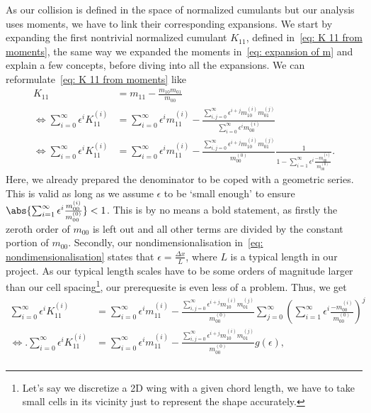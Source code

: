 As our collision is defined in the space of normalized cumulants but our analysis uses moments, we have to link their corresponding expansions.
We start by expanding the first nontrivial normalized cumulant $K_{11}$, defined in~\eqref{eq: K 11 from moments}, the same way we expanded the moments in~\eqref{eq: expansion of m} and explain a few concepts, before diving into all the expansions.
We can reformulate~\eqref{eq: K 11 from moments} like
\begin{equation}
  \label{eq: first expansion}
  \begin{aligned}
    K_{11} & = m_{11} - \frac{m_{10}m_{01}}{m_{00}}\\
    \Leftrightarrow
    \sum_{i=0}^\infty \epsilon^i K_{11}^{(i)}
    & = \sum_{i=0}^\infty \epsilon^i m_{11}^{(i)} -
    \frac{\sum_{i,j=0}^\infty \epsilon^{i+j} m_{10}^{(i)}m_{01}^{(j)}}
        {\sum_{i=0}^\infty \epsilon^i m_{00}^{(i)}}\\
    \Leftrightarrow
    \sum_{i=0}^\infty \epsilon^i K_{11}^{(i)}
    & = \sum_{i=0}^\infty \epsilon^i m_{11}^{(i)} -
    \frac{\sum_{i,j=0}^\infty \epsilon^{i+j} m_{10}^{(i)}m_{01}^{(j)}}
        {m_{00}^{(0)}}
        \frac{1}{1 - \sum_{i=1}^\infty \epsilon^i \frac{ - m_{00}^{(i)}}{ m_{00}^{(0)}}}.
  \end{aligned}
\end{equation}
Here, we already prepared the denominator to be coped with a geometric series.
This is valid as long as we assume $\epsilon$ to be `small enough' to ensure $\abs{\sum_{i=1}^\infty \epsilon^i \frac{ m_{00}^{(i)}}{ m_{00}^{(0)}} } < 1$.
This is by no means a bold statement, as firstly the zeroth order of $m_{00}$ is left out and all other terms are divided by the constant portion of $m_{00}$.
Secondly, our nondimensionalisation in~\eqref{eq: nondimensionalisation} states that $\epsilon = \frac{\Delta x}{L}$, where $L$ is a typical length in our project.
As our typical length scales have to be some orders of magnitude larger than our cell spacing\footnote{Let's say we discretize a 2D wing with a given chord length, we have to take small cells in its vicinity just to represent the shape accurately.}, our prerequesite is even less of a problem.
Thus, we get
\begin{equation}
  \label{eq: first expansion continue}
  \begin{aligned}
    \sum_{i=0}^\infty \epsilon^i K_{11}^{(i)}
    & = \sum_{i=0}^\infty \epsilon^i m_{11}^{(i)} -
    \frac{\sum_{i,j=0}^\infty \epsilon^{i+j} m_{10}^{(i)}m_{01}^{(j)}}
        {m_{00}^{(0)}}
    \sum_{j=0}^\infty {\left(\sum_{i=1}^\infty \epsilon^i \frac{ - m_{00}^{(i)}}{ m_{00}^{(0)}}\right)}^j\\
    \Leftrightarrow.
    \sum_{i=0}^\infty \epsilon^i K_{11}^{(i)}
    & = \sum_{i=0}^\infty \epsilon^i m_{11}^{(i)} -
    \frac{\sum_{i,j=0}^\infty \epsilon^{i+j} m_{10}^{(i)}m_{01}^{(j)}}
    {m_{00}^{(0)}}
    g(\epsilon),\\
  \end{aligned}
\end{equation}
